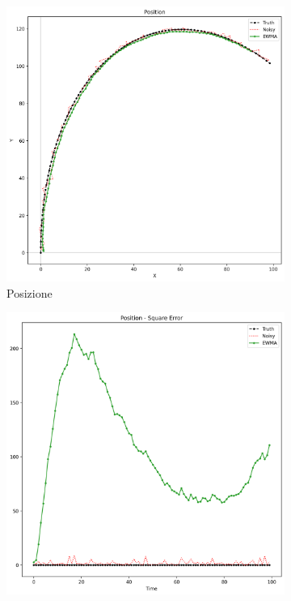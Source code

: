 \begin{figure}
    \centering
    \begin{subfigure}[b]{0.45\textwidth}
        \includegraphics[width=\textwidth]{images/pos0.png}
        \caption{Posizione}
    \end{subfigure}
    \hfill
    \begin{subfigure}[b]{0.45\textwidth}
        \includegraphics[width=\textwidth]{images/pos0err.png}

\end{subfigure}
\end{figure}
